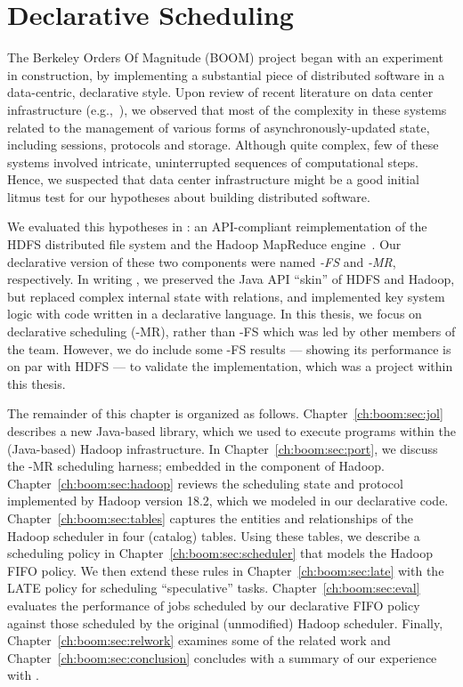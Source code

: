 \chapter[Declarative Scheduling]{Declarative Scheduling}
\label{ch:boom}

The Berkeley Orders Of Magnitude (BOOM) project began with an experiment in
construction, by implementing a substantial piece of distributed software in a
data-centric, declarative style.  Upon review of recent literature on
data center infrastructure (e.g.,~\cite{chubby,gfs-sosp,dynamo,mapreduce-osdi}),
we observed that most of the complexity in these systems related to the
management of various forms of asynchronously-updated state, including
sessions, protocols and storage.  Although quite complex, few of these systems
involved intricate, uninterrupted sequences of computational steps.  Hence, we
suspected that data center infrastructure might be a good initial litmus test
for our hypotheses about building distributed software.

We evaluated this hypotheses in {\em \BOOMA}: an API-compliant reimplementation
of the HDFS distributed file system and the Hadoop MapReduce
engine~\cite{boom}.  Our declarative version of these two components were named
{\em \BOOM-FS} and {\em \BOOM-MR}, respectively.  In writing \BOOMA, we
preserved the Java API ``skin'' of HDFS and Hadoop, but replaced complex
internal state with relations, and implemented key system logic with code
written in a declarative language.  In this thesis, we focus on declarative
scheduling (\BOOM-MR), rather than \BOOM-FS which was led by other members of
the \BOOMA team.  However, we do include some \BOOM-FS results --- showing its
performance is on par with HDFS --- to validate the \JOL implementation, which
was a project within this thesis.

The remainder of this chapter is organized as follows.
Chapter~\ref{ch:boom:sec:jol} describes a new Java-based \OVERLOG library,
which we used to execute \OVERLOG programs within the (Java-based) Hadoop
infrastructure.  In Chapter~\ref{ch:boom:sec:port}, we discuss the \BOOM-MR
scheduling harness; embedded in the \JT component of Hadoop.
Chapter~\ref{ch:boom:sec:hadoop} reviews the scheduling state and protocol
implemented by Hadoop version 18.2, which we modeled in our declarative code.
Chapter~\ref{ch:boom:sec:tables} captures the entities and relationships of the
Hadoop scheduler in four (catalog) tables.  Using these tables, we describe a
scheduling policy in Chapter~\ref{ch:boom:sec:scheduler} that models the Hadoop
FIFO policy.  We then extend these rules in Chapter~\ref{ch:boom:sec:late} with
the LATE policy for scheduling ``speculative'' tasks.
Chapter~\ref{ch:boom:sec:eval} evaluates the performance of jobs scheduled by
our declarative FIFO policy against those scheduled by the original
(unmodified) Hadoop scheduler.  Finally, Chapter~\ref{ch:boom:sec:relwork}
examines some of the related work and Chapter~\ref{ch:boom:sec:conclusion}
concludes with a summary of our experience with \BOOMA.

